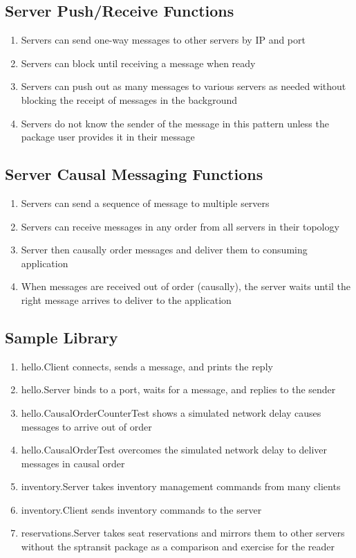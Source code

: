 \documentclass[11pt,journal,compsoc]{IEEEtran}
\begin{document}
\subsection{Server Push/Receive Functions}
\begin{enumerate}
    \item Servers can send one-way messages to other servers by IP and port
    \item Servers can block until receiving a message when ready
    \item Servers can push out as many messages to various servers as needed without blocking the receipt of messages in the background
    \item Servers do not know the sender of the message in this pattern unless the package user provides it in their message
\end{enumerate}

\subsection{Server Causal Messaging Functions}
\begin{enumerate}
    \item Servers can send a sequence of message to multiple servers
    \item Servers can receive messages in any order from all servers 
    in their topology
    \item Server then causally order messages and deliver them to 
    consuming application
    \item When messages are received out of order (causally), the server
    waits until the right message arrives to deliver to the application
\end{enumerate}

\subsection{Sample Library}
\begin{enumerate}
    \item hello.Client connects, sends a message, and prints the reply
    \item hello.Server binds to a port, waits for a message, and replies to the sender
    \item hello.CausalOrderCounterTest shows a simulated network delay causes messages to arrive out of order
    \item hello.CausalOrderTest overcomes the simulated network delay to deliver messages in causal order
    \item inventory.Server takes inventory management commands from many clients
    \item inventory.Client sends inventory commands to the server
    \item reservations.Server takes seat reservations and mirrors them to other servers without the sptransit package as a comparison and exercise for the reader
\end{enumerate}
\end{document}
